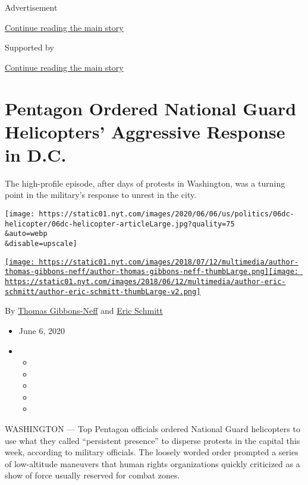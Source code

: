 Advertisement

\protect\hyperlink{after-top}{Continue reading the main story}

Supported by

\protect\hyperlink{after-sponsor}{Continue reading the main story}

\hypertarget{pentagon-ordered-national-guard-helicopters-aggressive-response-in-dc}{%
\section{Pentagon Ordered National Guard Helicopters' Aggressive
Response in
D.C.}\label{pentagon-ordered-national-guard-helicopters-aggressive-response-in-dc}}

The high-profile episode, after days of protests in Washington, was a
turning point in the military's response to unrest in the city.

\texttt{[image: https://static01.nyt.com/images/2020/06/06/us/politics/06dc-helicopter/06dc-helicopter-articleLarge.jpg?quality=75\\\&auto=webp\\\&disable=upscale]}

\href{https://www.nytimes.com/by/thomas-gibbons-neff}{\texttt{[image: https://static01.nyt.com/images/2018/07/12/multimedia/author-thomas-gibbons-neff/author-thomas-gibbons-neff-thumbLarge.png]}}\href{https://www.nytimes.com/by/eric-schmitt}{\texttt{[image: https://static01.nyt.com/images/2018/06/12/multimedia/author-eric-schmitt/author-eric-schmitt-thumbLarge-v2.png]}}

By \href{https://www.nytimes.com/by/thomas-gibbons-neff}{Thomas
Gibbons-Neff} and \href{https://www.nytimes.com/by/eric-schmitt}{Eric
Schmitt}

\begin{itemize}
\item
  June 6, 2020
\item
  \begin{itemize}
  \item
  \item
  \item
  \item
  \item
  \end{itemize}
\end{itemize}

WASHINGTON --- Top Pentagon officials ordered National Guard helicopters
to use what they called ``persistent presence'' to disperse protests in
the capital this week, according to military officials. The loosely
worded order prompted a series of low-altitude maneuvers that human
rights organizations quickly criticized as a show of force usually
reserved for combat zones.

